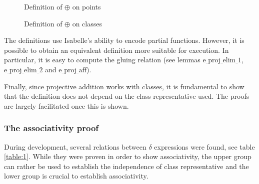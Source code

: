\documentclass[runningheads]{llncs}
\begin{document}
\begin{figure}
{}
\caption{Definition of $\oplus$ on points}
\label{fig3}
\end{figure}
\begin{figure}
	{}
	{}
	\caption{Definition of $\oplus$ on classes}
	\label{fig4}
\end{figure}

The definitions use Isabelle's ability to encode partial functions. However, it is possible to obtain an equivalent definition more suitable for execution. In particular, it is easy to compute the gluing relation (see lemmas $\text{e\_proj\_elim\_1}$, $\text{e\_proj\_elim\_2}$ and $\text{e\_proj\_aff}$).

Finally, since projective addition works with classes, it is fundamental to show that the definition does not depend on the class representative used. The proofs are largely facilitated once this is shown.

\subsubsection{The associativity proof}

During development, several relations between $\delta$ expressions were found, see table \ref{table:1}. While they were proven in order to show associativity, the upper group can rather be used to establish the independence of class representative and the lower group is crucial to establish associativity.
\end{document}

